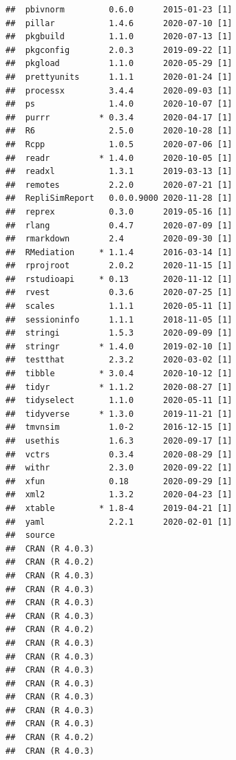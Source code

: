 \documentclass[10,a4paperpaper,]{article}
\begin{document}
\begin{verbatim}
##  pbivnorm         0.6.0      2015-01-23 [1]
##  pillar           1.4.6      2020-07-10 [1]
##  pkgbuild         1.1.0      2020-07-13 [1]
##  pkgconfig        2.0.3      2019-09-22 [1]
##  pkgload          1.1.0      2020-05-29 [1]
##  prettyunits      1.1.1      2020-01-24 [1]
##  processx         3.4.4      2020-09-03 [1]
##  ps               1.4.0      2020-10-07 [1]
##  purrr          * 0.3.4      2020-04-17 [1]
##  R6               2.5.0      2020-10-28 [1]
##  Rcpp             1.0.5      2020-07-06 [1]
##  readr          * 1.4.0      2020-10-05 [1]
##  readxl           1.3.1      2019-03-13 [1]
##  remotes          2.2.0      2020-07-21 [1]
##  RepliSimReport   0.0.0.9000 2020-11-28 [1]
##  reprex           0.3.0      2019-05-16 [1]
##  rlang            0.4.7      2020-07-09 [1]
##  rmarkdown        2.4        2020-09-30 [1]
##  RMediation     * 1.1.4      2016-03-14 [1]
##  rprojroot        2.0.2      2020-11-15 [1]
##  rstudioapi     * 0.13       2020-11-12 [1]
##  rvest            0.3.6      2020-07-25 [1]
##  scales           1.1.1      2020-05-11 [1]
##  sessioninfo      1.1.1      2018-11-05 [1]
##  stringi          1.5.3      2020-09-09 [1]
##  stringr        * 1.4.0      2019-02-10 [1]
##  testthat         2.3.2      2020-03-02 [1]
##  tibble         * 3.0.4      2020-10-12 [1]
##  tidyr          * 1.1.2      2020-08-27 [1]
##  tidyselect       1.1.0      2020-05-11 [1]
##  tidyverse      * 1.3.0      2019-11-21 [1]
##  tmvnsim          1.0-2      2016-12-15 [1]
##  usethis          1.6.3      2020-09-17 [1]
##  vctrs            0.3.4      2020-08-29 [1]
##  withr            2.3.0      2020-09-22 [1]
##  xfun             0.18       2020-09-29 [1]
##  xml2             1.3.2      2020-04-23 [1]
##  xtable         * 1.8-4      2019-04-21 [1]
##  yaml             2.2.1      2020-02-01 [1]
##  source                                   
##  CRAN (R 4.0.3)                           
##  CRAN (R 4.0.2)                           
##  CRAN (R 4.0.3)                           
##  CRAN (R 4.0.3)                           
##  CRAN (R 4.0.3)                           
##  CRAN (R 4.0.3)                           
##  CRAN (R 4.0.2)                           
##  CRAN (R 4.0.3)                           
##  CRAN (R 4.0.3)                           
##  CRAN (R 4.0.3)                           
##  CRAN (R 4.0.3)                           
##  CRAN (R 4.0.3)                           
##  CRAN (R 4.0.3)                           
##  CRAN (R 4.0.3)                           
##  CRAN (R 4.0.2)                           
##  CRAN (R 4.0.3)                           

\end{verbatim}
\end{document}
